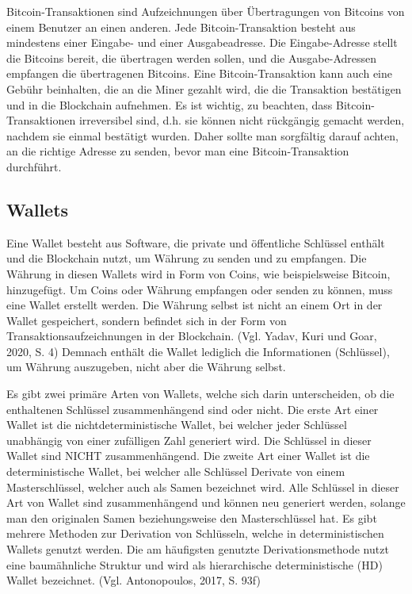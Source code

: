 Bitcoin-Transaktionen sind Aufzeichnungen über Übertragungen von Bitcoins von einem Benutzer an einen anderen. Jede
Bitcoin-Transaktion besteht aus mindestens einer Eingabe- und einer Ausgabeadresse. Die Eingabe-Adresse stellt die Bitcoins
bereit, die übertragen werden sollen, und die Ausgabe-Adressen empfangen die übertragenen Bitcoins. Eine Bitcoin-Transaktion
kann auch eine Gebühr beinhalten, die an die Miner gezahlt wird, die die Transaktion bestätigen und in die Blockchain aufnehmen.
Es ist wichtig, zu beachten, dass Bitcoin-Transaktionen irreversibel sind, d.h. sie können nicht rückgängig gemacht werden,
nachdem sie einmal bestätigt wurden. Daher sollte man sorgfältig darauf achten, an die richtige Adresse zu senden, bevor man eine
Bitcoin-Transaktion durchführt.

\subsection{Wallets}
Eine Wallet besteht aus Software, die private und öffentliche Schlüssel enthält und die Blockchain nutzt, um Währung zu senden
und zu empfangen. Die Währung in diesen Wallets wird in Form von Coins, wie beispielsweise Bitcoin, hinzugefügt. Um Coins oder
Währung empfangen oder senden zu können, muss eine Wallet erstellt werden. Die Währung selbst ist nicht an einem Ort in der Wallet
gespeichert, sondern befindet sich in der Form von Transaktionsaufzeichnungen in der Blockchain. (Vgl. Yadav, Kuri und Goar,
2020, S. 4) Demnach enthält die Wallet lediglich die Informationen (Schlüssel), um Währung auszugeben, nicht aber die Währung
selbst.

Es gibt zwei primäre Arten von Wallets, welche sich darin unterscheiden, ob die enthaltenen Schlüssel zusammenhängend sind oder
nicht. Die erste Art einer Wallet ist die nichtdeterministische Wallet, bei welcher jeder Schlüssel unabhängig von einer 
zufälligen Zahl generiert wird. Die Schlüssel in dieser Wallet sind NICHT zusammenhängend. Die zweite Art einer Wallet ist die
deterministische Wallet, bei welcher alle Schlüssel Derivate von einem Masterschlüssel, welcher auch als Samen bezeichnet wird.
Alle Schlüssel in dieser Art von Wallet sind zusammenhängend und können neu generiert werden, solange man den originalen Samen
beziehungsweise den Masterschlüssel hat. Es gibt mehrere Methoden zur Derivation von Schlüsseln, welche in deterministischen
Wallets genutzt werden. Die am häufigsten genutzte Derivationsmethode nutzt eine baumähnliche Struktur und wird als 
hierarchische deterministische (HD) Wallet bezeichnet. (Vgl. Antonopoulos, 2017, S. 93f)

